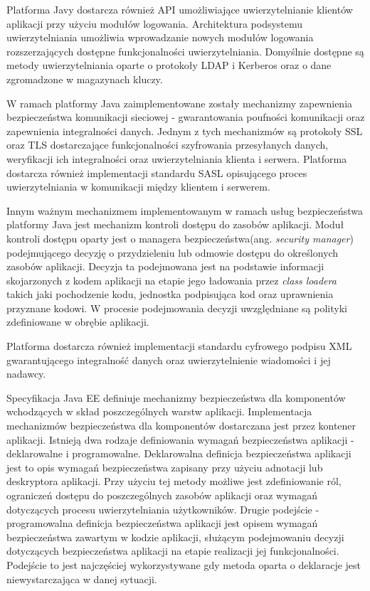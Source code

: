 		Platforma Javy dostarcza również API umożliwiające uwierzytelnianie klientów aplikacji przy użyciu modułów logowania. Architektura podsystemu uwierzytelniania umożliwia wprowadzanie nowych modułów logowania rozszerzających dostępne funkcjonalności uwierzytelniania. Domyślnie dostępne są metody uwierzytelniania oparte o protokoły LDAP i Kerberos oraz o dane zgromadzone w magazynach kluczy.

		W ramach platformy Java zaimplementowane zostały mechanizmy zapewnienia bezpieczeństwa komunikacji sieciowej - gwarantowania poufności komunikacji oraz zapewnienia integralności danych. Jednym z tych mechanizmów są protokoły SSL oraz TLS dostarczające funkcjonalności  szyfrowania przesyłanych danych, weryfikacji ich integralności oraz uwierzytelniania klienta i serwera. Platforma dostarcza również implementacji standardu SASL opisującego proces uwierzytelniania w komunikacji między klientem i serwerem. 

		Innym ważnym mechanizmem implementowanym w ramach usług bezpieczeństwa platformy Java jest mechanizm kontroli dostępu do zasobów aplikacji. Moduł kontroli dostępu oparty jest o managera bezpieczeństwa(ang. \textit{security manager})  podejmującego decyzję o przydzieleniu lub odmowie dostępu do określonych zasobów aplikacji. Decyzja ta podejmowana jest na podstawie informacji skojarzonych z kodem aplikacji na etapie jego ładowania przez \textit{class loadera}  takich jaki pochodzenie kodu, jednostka podpisująca kod oraz uprawnienia przyznane kodowi. W procesie podejmowania decyzji uwzględniane są polityki zdefiniowane w obrębie aplikacji. 

		Platforma dostarcza również implementacji standardu cyfrowego podpisu XML gwarantującego integralność danych oraz uwierzytelnienie wiadomości i jej nadawcy.
	

\label{sec:javaEE}

	Specyfikacja Java EE definiuje mechanizmy bezpieczeństwa dla komponentów wchodzących w skład poszczególnych warstw aplikacji. Implementacja mechanizmów bezpieczeństwa dla komponentów dostarczana jest przez kontener aplikacji. Istnieją dwa rodzaje definiowania wymagań bezpieczeństwa aplikacji - deklarowalne i programowalne\cite{Oracle12}. Deklarowalna definicja bezpieczeństwa aplikacji jest to opis wymagań bezpieczeństwa zapisany przy użyciu adnotacji lub deskryptora aplikacji. Przy użyciu tej metody możliwe jest zdefiniowanie ról, ograniczeń dostępu do poszczególnych zasobów aplikacji oraz wymagań dotyczących procesu uwierzytelniania użytkowników. Drugie podejście - programowalna definicja bezpieczeństwa aplikacji jest opisem wymagań bezpieczeństwa zawartym w kodzie aplikacji, służącym podejmowaniu decyzji dotyczących bezpieczeństwa aplikacji na etapie realizacji jej funkcjonalności. Podejście to jest najczęściej wykorzystywane gdy metoda oparta o deklaracje jest niewystarczająca w danej sytuacji.

